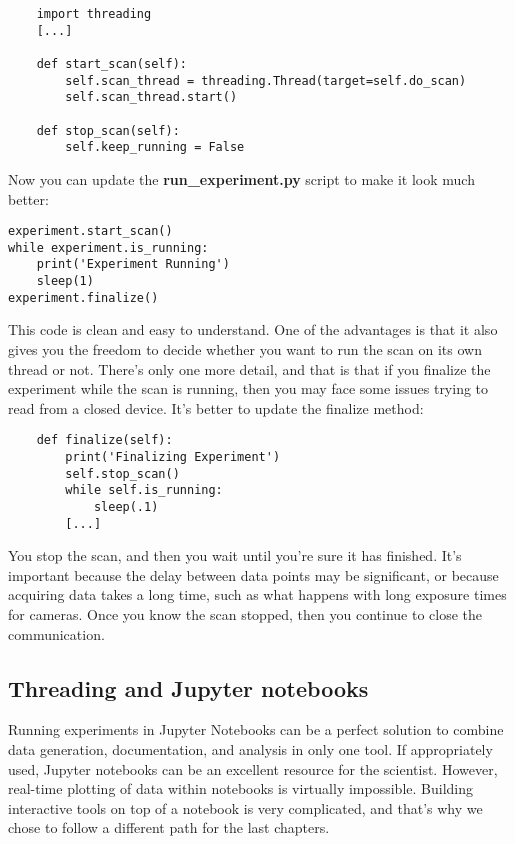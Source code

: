 \begin{verbatim}
    import threading
    [...]

    def start_scan(self):
        self.scan_thread = threading.Thread(target=self.do_scan)
        self.scan_thread.start()

    def stop_scan(self):
        self.keep_running = False
\end{verbatim}

Now you can update the \textbf{run\_experiment.py} script to make it look much better:

\begin{verbatim}
experiment.start_scan()
while experiment.is_running:
    print('Experiment Running')
    sleep(1)
experiment.finalize()
\end{verbatim}

This code is clean and easy to understand. One of the advantages is that it also gives you the freedom to decide whether you want to run the scan on its own thread or not. There's only one more detail, and that is that if you finalize the experiment while the scan is running, then you may face some issues trying to read from a closed device. It's better to update the finalize method:

\begin{verbatim}
    def finalize(self):
        print('Finalizing Experiment')
        self.stop_scan()
        while self.is_running:
            sleep(.1)
        [...]
\end{verbatim}

You stop the scan, and then you wait until you're sure it has finished. It's important because the delay between data points may be significant, or because acquiring data takes a long time, such as what happens with long exposure times for cameras. Once you know the scan stopped, then you continue to close the communication.

\subsection{Threading and Jupyter notebooks}\label{subsec:jupyter}
Running experiments in Jupyter Notebooks can be a perfect solution to combine data generation, documentation, and analysis in only one tool. If appropriately used, Jupyter notebooks can be an excellent resource for the scientist. However, real-time plotting of data within notebooks is virtually impossible. Building interactive tools on top of a notebook is very complicated, and that's why we chose to follow a different path for the last chapters.

